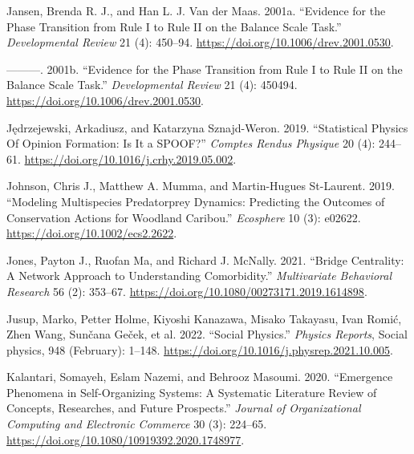 \documentclass[
  a4paper,
  DIV=11,
  numbers=noendperiod,
  oneside]{scrreprt}
\newlength{\cslhangindent}
\newlength{\cslentryspacingunit} %
\newenvironment{CSLReferences}[2] %
 {%
  \setlength{\parindent}{0pt}
  \ifodd #1
  \let\oldpar\par
  \def\par{\hangindent=\cslhangindent\oldpar}
  \fi
  \setlength{\parskip}{#2\cslentryspacingunit}
 }%
 {}
\begin{document}
\begin{CSLReferences}{1}{0}
\leavevmode{}%
Jansen, Brenda R. J., and Han L. J. Van der Maas. 2001a. {``Evidence for
the {Phase Transition} from {Rule I} to {Rule II} on the {Balance Scale
Task}.''} \emph{Developmental Review} 21 (4): 450--94.
\url{https://doi.org/10.1006/drev.2001.0530}.

\leavevmode{}%
---------. 2001b. {``Evidence for the Phase Transition from Rule I to
Rule II on the Balance Scale Task.''} \emph{Developmental Review} 21
(4): 450494. \url{https://doi.org/10.1006/drev.2001.0530}.

\leavevmode{}%
Jędrzejewski, Arkadiusz, and Katarzyna Sznajd-Weron. 2019.
{``Statistical {Physics Of Opinion Formation}: {Is} It a {SPOOF}?''}
\emph{Comptes Rendus Physique} 20 (4): 244--61.
\url{https://doi.org/10.1016/j.crhy.2019.05.002}.

\leavevmode{}%
Johnson, Chris J., Matthew A. Mumma, and Martin-Hugues St-Laurent. 2019.
{``Modeling Multispecies Predator\textendash prey Dynamics: Predicting
the Outcomes of Conservation Actions for Woodland Caribou.''}
\emph{Ecosphere} 10 (3): e02622.
\url{https://doi.org/10.1002/ecs2.2622}.

\leavevmode{}%
Jones, Payton J., Ruofan Ma, and Richard J. McNally. 2021. {``Bridge
{Centrality}: {A Network Approach} to {Understanding Comorbidity}.''}
\emph{Multivariate Behavioral Research} 56 (2): 353--67.
\url{https://doi.org/10.1080/00273171.2019.1614898}.

\leavevmode{}%
Jusup, Marko, Petter Holme, Kiyoshi Kanazawa, Misako Takayasu, Ivan
Romić, Zhen Wang, Sunčana Geček, et al. 2022. {``Social Physics.''}
\emph{Physics Reports}, Social physics, 948 (February): 1--148.
\url{https://doi.org/10.1016/j.physrep.2021.10.005}.

\leavevmode{}%
Kalantari, Somayeh, Eslam Nazemi, and Behrooz Masoumi. 2020.
{``Emergence Phenomena in Self-Organizing Systems: A Systematic
Literature Review of Concepts, Researches, and Future Prospects.''}
\emph{Journal of Organizational Computing and Electronic Commerce} 30
(3): 224--65. \url{https://doi.org/10.1080/10919392.2020.1748977}.


\end{CSLReferences}
\end{document}
